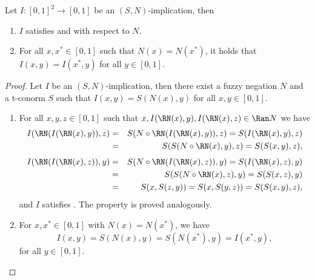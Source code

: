 \begin{proposition}\label{prop:(R1)&(R2)} Let $I:[0,1]^2 \to [0,1]$ be an $(S,N)$-implication, then
	\begin{enumerate}[label=(\roman*)]
		\item $I$ satisfies \Rone and \Rtwo with respect to $N$.
		\item For all $x,x^*\in[0,1]$ such that $N(x)=N(x^*)$, it holds that $I(x,y)=I(x^*,y)$ for all $y\in[0,1]$.
	\end{enumerate}
\end{proposition}
\begin{proof} Let $I$ be an $(S,N)$-implication, then there exist a fuzzy negation $N$ and a t-conorm $S$ such that $I(x,y)=S(N(x),y)$ for all $x,y \in [0,1]$.
	\begin{enumerate}[label=(\roman*)]
		\item For all $x,y,z \in [0,1]$ such that $x, I(\RN(x),y), I(\RN(x),z) \in \Ran N$ we have
		\begin{eqnarray*}
			I(\RN(I(\RN(x),y)),z) &=& S(N \circ \RN(I(\RN(x),y)),z) = S(I(\RN(x),y),z) \\
			&=& S(S(N \circ \RN(x),y),z) =S(S(x,y),z),
		\end{eqnarray*}
		\begin{eqnarray*}
			I(\RN(I(\RN(x),z)),y) &=& S(N \circ \RN(I(\RN(x),z)),y) = S(I(\RN(x),z),y) \\ 
			&=& S(S(N \circ \RN(x),z),y) = S(S(x,z),y)  \\
			&=& S(x,S(z,y)) =S(x,S(y,z))=S(S(x,y),z),
		\end{eqnarray*}
		and $I$ satisfies \Rone. The property \Rtwo is proved analogously.
		\item For $x, x^* \in [0,1]$ with $N(x)=N(x^*)$, we have
		$$I(x,y)=S(N(x),y)=S(N(x^*),y)=I(x^*,y),$$
		for all $y \in [0,1]$.
	\end{enumerate}
\end{proof}


